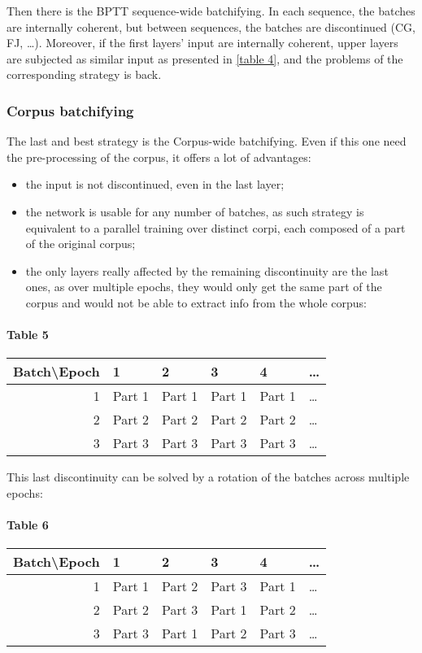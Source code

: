 Then there is the {BPTT sequence-wide batchifying}. In each sequence, the batches are internally coherent, but between sequences, the batches are discontinued (C\textbar{}G, F\textbar{}J, \ldots{}). Moreover, if the first layers' input are internally coherent, upper layers are subjected as similar input as presented in \ref{table 4}, and the problems of the corresponding strategy is back.

\subsubsection{Corpus batchifying}\label{corpus-batchifying}

The last and best strategy is the
{Corpus-wide
batchifying}. Even if this one need the pre-processing of the corpus, it
offers a lot of advantages:
\begin{itemize}
	\item the input is not discontinued, even in the last layer;
	\item the network is usable for any number of batches, as such strategy is equivalent to a parallel training over distinct corpi, each composed of a part of the original corpus;
	\item the only layers really affected by the remaining discontinuity are the last ones, as over multiple epochs, they would only get the same part of the corpus and would not be able to extract info from the whole corpus:
\end{itemize}
	
\paragraph{Table 5}
\begin{tabular}[]{|r|lllll|}
	\hline
	Batch\textbackslash Epoch & 1 & 2 & 3 & 4 & \ldots{} \\
	\hline
	1 & Part 1 & Part 1 & Part 1 & Part 1 & \ldots{} \\
	2 & Part 2 & Part 2 & Part 2 & Part 2 & \ldots{} \\
	3 & Part 3 & Part 3 & Part 3 & Part 3 & \ldots{} \\
	\hline
\end{tabular}

This last discontinuity can be solved by a rotation of the batches
across multiple epochs:

\paragraph{Table 6}
\begin{tabular}[]{|r|lllll|}
	\hline
	Batch\textbackslash Epoch & 1 & 2 & 3 & 4 & \ldots{} \\
	\hline
	1 & Part 1 & Part 2 & Part 3 & Part 1 & \ldots{} \\
	2 & Part 2 & Part 3 & Part 1 & Part 2 & \ldots{} \\
	3 & Part 3 & Part 1 & Part 2 & Part 3 & \ldots{} \\
	\hline
\end{tabular}

